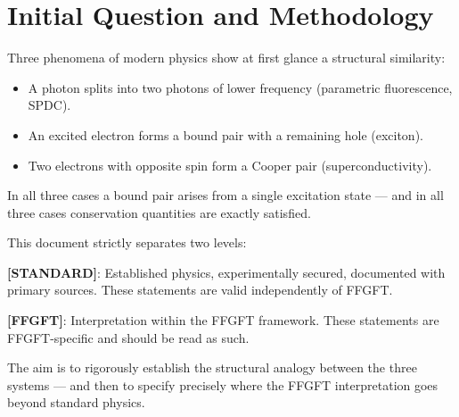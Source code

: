 %

\providecommand{\ket}[1]{\left|#1\right\rangle}
\providecommand{\bra}[1]{\left\langle#1\right|}

\section{Initial Question and Methodology}
\label{sec:initial-question}

Three phenomena of modern physics show at first glance
a structural similarity:

\begin{itemize}
  \item A photon splits into two photons of lower frequency
    (parametric fluorescence, SPDC).
  \item An excited electron forms a bound pair with a remaining
    hole (exciton).
  \item Two electrons with opposite spin form
    a Cooper pair (superconductivity).
\end{itemize}

In all three cases a bound pair arises from a single
excitation state --- and in all three cases
conservation quantities are exactly satisfied.

\begin{important}
This document strictly separates two levels:

\textbf{[STANDARD]}: Established physics, experimentally secured,
documented with primary sources.
These statements are valid independently of FFGFT.

\textbf{[FFGFT]}: Interpretation within the FFGFT framework.
These statements are FFGFT-specific and
should be read as such.

The aim is to rigorously establish the structural analogy between the three systems --- and then to specify precisely where the FFGFT interpretation goes beyond standard physics.
\end{important}

